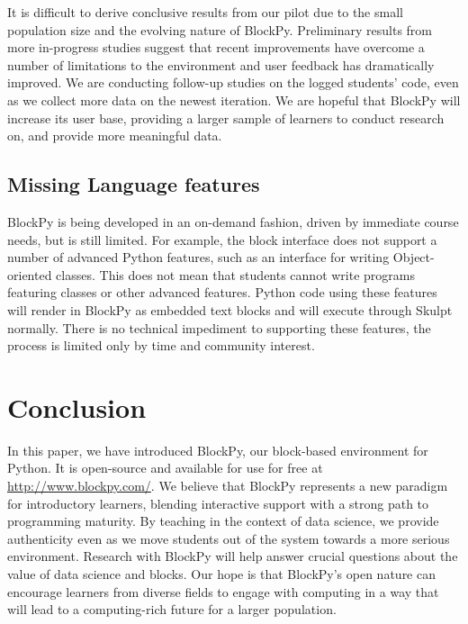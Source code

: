 \documentclass[10pt, conference, compsocconf]{IEEEtran}
\begin{document}
It is difficult to derive conclusive results from our pilot due to the small population size and the evolving nature of BlockPy.
Preliminary results from more in-progress studies suggest that recent improvements have overcome a number of limitations to the environment and user feedback has dramatically improved.
We are conducting follow-up studies on the logged students' code, even as we collect more data on the newest iteration.
We are hopeful that BlockPy will increase its user base, providing a larger sample of learners to conduct research on, and provide more meaningful data.

\subsection{Missing Language features}

BlockPy is being developed in an on-demand fashion, driven by immediate  course needs, but is still limited.
For example, the block interface does not support a number of advanced Python features, such as an interface for writing Object-oriented classes.
This does not mean that students cannot write programs featuring classes or other advanced features.
Python code using these features will render in BlockPy as embedded text blocks and will execute through Skulpt normally.
There is no technical impediment to supporting these features, the process is limited only by time and community interest.


\section{Conclusion}

In this paper, we have introduced BlockPy, our block-based environment for Python.
It is open-source and available for use for free at \url{http://www.blockpy.com/}.
We believe that BlockPy represents a new paradigm for introductory learners, blending interactive support with a strong path to programming maturity.
By teaching in the context of data science, we provide authenticity even as we move students out of the system towards a more serious environment. 
Research with BlockPy will help answer crucial questions about the value of data science and blocks.
Our hope is that BlockPy's open nature can encourage learners from diverse fields to engage with computing in a way that will lead to a computing-rich future for a larger population.
\end{document}
